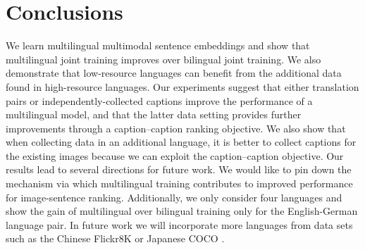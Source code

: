 \section{Conclusions}
We learn multilingual multimodal sentence embeddings and show that multilingual joint training improves over bilingual joint training. We also demonstrate that low-resource languages can benefit from the additional data found in high-resource languages. Our experiments suggest that either translation pairs or independently-collected captions improve the performance of a multilingual model, and that the latter data setting provides further improvements through a caption--caption ranking objective. We also show that when collecting data in an additional language, it is better to collect captions for the existing images because we can exploit the caption--caption objective. Our results lead to several directions for future work. We would like to pin down the mechanism via which multilingual training contributes to improved performance for image-sentence ranking. Additionally, we only consider four languages and show the gain of multilingual over bilingual training only for the English-German language pair. In future work we will incorporate more languages from data sets such as the Chinese Flickr8K \cite{li2016adding} or Japanese COCO \cite{P16-1168}. 

